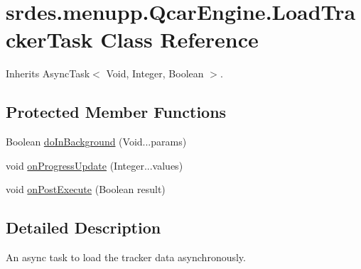 \hypertarget{classsrdes_1_1menupp_1_1_qcar_engine_1_1_load_tracker_task}{\section{srdes.\-menupp.\-Qcar\-Engine.\-Load\-Tracker\-Task \-Class \-Reference}
\label{classsrdes_1_1menupp_1_1_qcar_engine_1_1_load_tracker_task}
}


\-Inherits \-Async\-Task$<$ Void, Integer, Boolean $>$.

\subsection*{\-Protected \-Member \-Functions}
\begin{DoxyCompactItemize}
\item 
\-Boolean \hyperlink{classsrdes_1_1menupp_1_1_qcar_engine_1_1_load_tracker_task_a6b1ec62d1f431ae5cfb2f94c2bcde43b}{do\-In\-Background} (\-Void...\-params)
\item 
void \hyperlink{classsrdes_1_1menupp_1_1_qcar_engine_1_1_load_tracker_task_a518d820be81a9b42c82e3d930e069344}{on\-Progress\-Update} (\-Integer...\-values)
\item 
void \hyperlink{classsrdes_1_1menupp_1_1_qcar_engine_1_1_load_tracker_task_a06937ea444575f18d3b8f5fd7bcf6b1b}{on\-Post\-Execute} (\-Boolean result)
\end{DoxyCompactItemize}


\subsection{\-Detailed \-Description}
\-An async task to load the tracker data asynchronously. 

